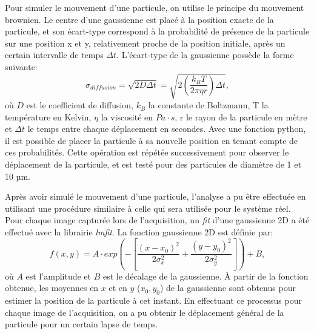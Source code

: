 \documentclass[conference]{IEEEtran}
\begin{document}
Pour simuler le mouvement d'une particule, on utilise le principe du mouvement brownien.
Le centre d'une gaussienne est placé à la position exacte de la particule, et son écart-type correspond à la probabilité de présence de la particule sur une position x et y, 
relativement proche de la position initiale, après un certain intervalle de temps $\Delta t$. L'écart-type de la gaussienne possède la forme suivante:
\begin{equation}
  \sigma_{diffusion} = \sqrt{2D\Delta t} = \sqrt{2\left ( \frac{k_{B}T}{2\pi \eta r} \right )\Delta t},
\end{equation}
où $D$ est le coefficient de diffusion, $k_{B}$ la constante de Boltzmann, T la température en Kelvin, $\eta$ la viscosité en $Pa\cdot s$, r le rayon de la particule en mètre et $\Delta t$ le temps entre chaque déplacement en secondes. 
Avec une fonction python, il est possible de placer la particule à sa nouvelle position en tenant compte de ces probabilités. Cette opération est répétée successivement pour observer 
le déplacement de la particule, et est testé pour des particules de diamètre de 1 et 10 µm.


Après avoir simulé le mouvement d'une particule, l'analyse a pu être effectuée en utilisant une procédure similaire
à celle qui sera utilisée pour le système réel. Pour chaque image capturée lors de l'acquisition, un \textit{fit}
d'une gaussienne 2D a été effectué avec la librairie \textit{lmfit}. La fonction gaussienne 2D est définie par:
\begin{equation}
  f(x,y)=A\cdot exp\left(-\left[\frac{(x-x_0)^2}{2\sigma_x^2}+\frac{(y-y_0)^2}{2\sigma_y^2}\right]\right)+B,
\end{equation}
où $A$ est l'amplitude et $B$ est le décalage de la gaussienne. À partir de la fonction obtenue, les moyennes en $x$ et en $y$ ($x_0,y_0$) de la gaussienne sont obtenus
pour estimer la position de la particule à cet instant. En effectuant ce processus pour chaque image de l'acquisition,
on a pu obtenir le déplacement général de la particule pour un certain lapse de temps.
\end{document}
